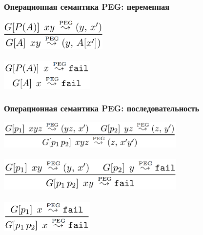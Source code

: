 \documentclass{beamer}
\begin{document}
\begin{frame}[fragile]
  \transwipe[direction=90]
  \frametitle{Операционная семантика PEG: переменная}
\begin{center}
  \includegraphics[width=0.4\textwidth]{pics/var1}  \\~\\     \pause
  \includegraphics[width=0.35\textwidth]{pics/var2} 
\end{center}
\end{frame}


\begin{frame}[fragile]
  \transwipe[direction=90]
  \frametitle{Операционная семантика PEG: последовательность}
\begin{center}
  \includegraphics[width=0.7\textwidth]{pics/con1}  \\~\\     \pause
  \includegraphics[width=0.7\textwidth]{pics/con2}  \\~\\     \pause
  \includegraphics[width=0.35\textwidth]{pics/con3}
\end{center}
\end{frame}
\end{document}
